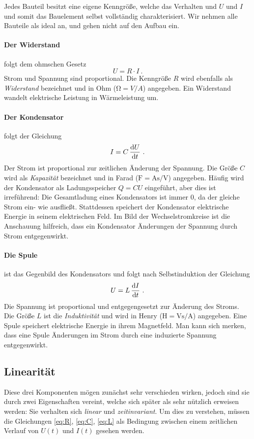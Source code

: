 Jedes Bauteil besitzt eine eigene Kenngröße, welche das Verhalten und $U$ und $I$ und somit das Bauelement selbst
vollständig charakterisiert. Wir nehmen alle Bauteile als ideal an, und gehen nicht auf den Aufbau ein.
\paragraph*{Der Widerstand} folgt dem ohmschen Gesetz
\begin{equation}\label{eq:R}
    U = R\cdot I ~.
\end{equation}
Strom und Spannung sind proportional. Die Kenngröße $R$ wird ebenfalls als \emph{Widerstand} bezeichnet und in Ohm
($\si{\ohm} = \si{V}/\si{A}$) angegeben. Ein Widerstand wandelt elektrische Leistung in Wärmeleistung um.
\paragraph*{Der Kondensator}
folgt der Gleichung
\begin{equation}\label{eq:C}
    I = C\,\dv{U}{t} ~.
\end{equation}
Der Strom ist proportional zur zeitlichen Änderung der Spannung. Die Größe $C$ wird als \emph{Kapazität} bezeichnet und
in Farad ($\si{\farad} = \si{\ampere\second}/\si{\volt}$) angegeben. Häufig wird der Kondensator als Ladungsspeicher $Q
= CU$ eingeführt, aber dies ist irreführend: Die Gesamtladung eines Kondensators ist immer 0, da der gleiche Strom ein-
wie ausfließt. Stattdessen speichert der Kondensator elektrische Energie in seinem elektrischen Feld. Im Bild der
Wechselstromkreise ist die Anschauung hilfreich, dass ein Kondensator Änderungen der Spannung durch Strom entgegenwirkt.
\paragraph*{Die Spule}
ist das Gegenbild des Kondensators und folgt nach Selbstinduktion der Gleichung
\begin{equation}\label{eq:L}
    U = L\,\dv{I}{t} ~.
\end{equation}
Die Spannung ist proportional und entgegengesetzt zur Änderung des Stroms. Die Größe $L$ ist die \emph{Induktivität} und
wird in Henry ($\si{\henry} = \si{\volt\second}/\si{\ampere}$) angegeben. Eine Spule speichert elektrische Energie in
ihrem Magnetfeld. Man kann sich merken, dass eine Spule Änderungen im Strom durch eine induzierte Spannung
entgegenwirkt.
\subsection{Linearität}
Diese drei Komponenten mögen zunächst sehr verschieden wirken, jedoch sind sie durch zwei Eigenschaften vereint, welche
sich später als sehr nützlich erweisen werden: Sie verhalten sich \emph{linear} und \emph{zeitinvariant}. Um dies zu
verstehen, müssen die Gleichungen \eqref{eq:R}, \eqref{eq:C}, \eqref{eq:L} als Bedingung zwischen einem zeitlichen
Verlauf von $U(t)$ und $I(t)$ gesehen werden.

